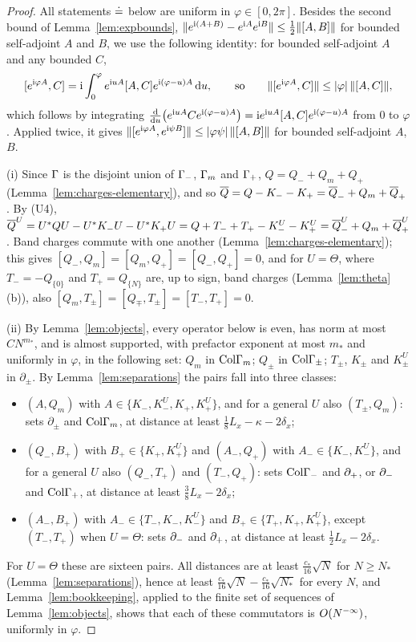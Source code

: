 \begin{proof}
All statements $\doteq$ below are uniform in $\varphi\in[0,2\pi]$. Besides the second bound of Lemma~\ref{lem:expbounds},
$\lVert e^{\mathrm{i}(A+B)}-e^{\mathrm{i} A}e^{\mathrm{i} B}\rVert\le\frac12\lVert[A,B]\rVert$ for bounded self-adjoint $A$ and $B$, we use the following
identity: for bounded self-adjoint $A$ and any bounded $C$,
\begin{equation}\label{eq:ix-duhamel}
[e^{\mathrm{i}\varphi A},C]=\mathrm{i}\int_0^\varphi e^{\mathrm{i} uA}[A,C]e^{\mathrm{i}(\varphi-u)A}\,\mathrm{d} u,\qquad\text{so}\qquad
\lVert[e^{\mathrm{i}\varphi A},C]\rVert\le\lvert\varphi\rvert\,\lVert[A,C]\rVert,
\end{equation}
which follows by integrating $\frac{\mathrm{d}}{\mathrm{d} u}\bigl(e^{\mathrm{i} uA}Ce^{\mathrm{i}(\varphi-u)A}\bigr)=\mathrm{i} e^{\mathrm{i} uA}[A,C]e^{\mathrm{i}(\varphi-u)A}$
from $0$ to $\varphi$. Applied twice, it gives $\lVert[e^{\mathrm{i}\varphi A},e^{\mathrm{i}\psi B}]\rVert\le\lvert\varphi\psi\rvert\,\lVert[A,B]\rVert$ for
bounded self-adjoint $A$, $B$.

(i) Since $\Gamma$ is the disjoint union of $\Gamma_{-}$, $\Gamma_{m}$ and $\Gamma_{+}$, $Q=Q_-+Q_m+Q_+$ (Lemma~\ref{lem:charges-elementary}),
and so $\overline{Q}=Q-K_--K_+=\overline{Q}_-+Q_m+\overline{Q}_+$. By (U4),
$\overline{Q}^U=U^*QU-U^*K_-U-U^*K_+U=Q+T_-+T_+-K^U_--K^U_+=\overline{Q}^U_-+Q_m+\overline{Q}^U_+$. Band charges commute with one another
(Lemma~\ref{lem:charges-elementary}); this gives $[Q_-,Q_m]=[Q_m,Q_+]=[Q_-,Q_+]=0$, and for $U=\Theta$, where
$T_-=-Q_{\{0\}}$ and $T_+=Q_{\{N\}}$ are, up to sign, band charges (Lemma~\ref{lem:theta}(b)), also
$[Q_m,T_\pm]=[Q_\mp,T_\pm]=[T_-,T_+]=0$.

(ii) By Lemma~\ref{lem:objects}, every operator below is even, has norm at most $CN^{m_*}$, and is almost supported,
with prefactor exponent at most $m_*$ and uniformly in $\varphi$, in the following set: $Q_m$ in $\mathrm{Col}\Gamma_{m}$; $Q_\pm$ in
$\mathrm{Col}\Gamma_\pm$; $T_\pm$, $K_\pm$ and $K^U_\pm$ in $\partial_\pm$. By Lemma~\ref{lem:separations} the pairs fall into three
classes:
\begin{itemize}
\item $(A,Q_m)$ with $A\in\{K_-,K^U_-,K_+,K^U_+\}$, and for a general $U$ also $(T_\pm,Q_m)$: sets $\partial_\pm$ and
$\mathrm{Col}\Gamma_{m}$, at distance at least $\frac18L_x-\kappa-2\delta_x$;
\item $(Q_-,B_+)$ with $B_+\in\{K_+,K^U_+\}$ and $(A_-,Q_+)$ with $A_-\in\{K_-,K^U_-\}$, and for a general $U$ also
$(Q_-,T_+)$ and $(T_-,Q_+)$: sets $\mathrm{Col}\Gamma_{-}$ and $\partial_{+}$, or $\partial_{-}$ and $\mathrm{Col}\Gamma_{+}$, at distance at least
$\frac38L_x-2\delta_x$;
\item $(A_-,B_+)$ with $A_-\in\{T_-,K_-,K^U_-\}$ and $B_+\in\{T_+,K_+,K^U_+\}$, except $(T_-,T_+)$ when $U=\Theta$:
sets $\partial_{-}$ and $\partial_{+}$, at distance at least $\frac12L_x-2\delta_x$.
\end{itemize}
For $U=\Theta$ these are sixteen pairs. All distances are at least $\frac{c_*}{16}\sqrt N$ for $N\ge N_*$
(Lemma~\ref{lem:separations}), hence at least $\frac{c_*}{16}\sqrt N-\frac{c_*}{16}\sqrt{N_*}$ for every $N$, and
Lemma~\ref{lem:bookkeeping}, applied to the finite set of sequences of Lemma~\ref{lem:objects}, shows that each of these
commutators is $O(N^{-\infty})$, uniformly in $\varphi$.


\end{proof}
